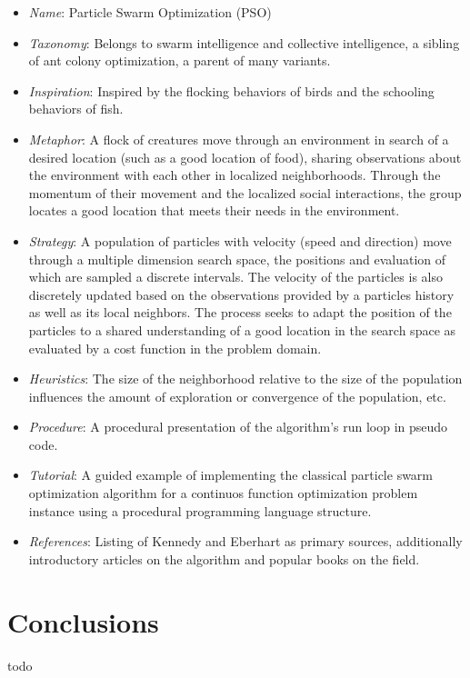 \documentclass[a4paper, 11pt]{article}
\begin{document}
\begin{itemize}
	\item \emph{Name}: Particle Swarm Optimization (PSO)
	\item \emph{Taxonomy}: Belongs to swarm intelligence and collective intelligence, a sibling of ant colony optimization, a parent of many variants.
	\item \emph{Inspiration}: Inspired by the flocking behaviors of birds and the schooling behaviors of fish.
	\item \emph{Metaphor}: A flock of creatures move through an environment in search of a desired location (such as a good location of food), sharing observations about the environment with each other in localized neighborhoods. Through the momentum of their movement and the localized social interactions, the group locates a good location that meets their needs in the environment. 
	\item \emph{Strategy}: A population of particles with velocity (speed and direction) move through a multiple dimension search space, the positions and evaluation of which are sampled a discrete intervals. The velocity of the particles is also discretely updated based on the observations provided by a particles history as well as its local neighbors. The process seeks to adapt the position of the particles to a shared understanding of a good location in the search space as evaluated by a cost function in the problem domain.
	\item \emph{Heuristics}: The size of the neighborhood relative to the size of the population influences the amount of exploration or convergence of the population, etc.
	\item \emph{Procedure}: A procedural presentation of the algorithm's run loop in pseudo code.
	\item \emph{Tutorial}: A guided example of implementing the classical particle swarm optimization algorithm for a continuos function optimization problem instance using a procedural programming language structure.
	\item \emph{References}: Listing of Kennedy and Eberhart as primary sources, additionally introductory articles on the algorithm and popular books on the field.
\end{itemize}

\section{Conclusions}
\label{sec:conclusions}
todo



\end{document}
